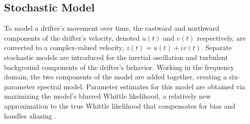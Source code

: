 \documentclass{stat572Style}
\begin{document}
\subsection{Stochastic Model}
 To model a drifter's movement over time, the eastward and northward components of the drifter's velocity, denoted $u(t)$ and $v(t)$ respectively, are converted to a complex-valued velocity, $z(t) = u(t) + iv(t)$. 
 Separate stochastic models are introduced for the inertial oscillation and turbulent background components of the drifter's behavior. 
 Working in the frequency domain, the two components of the model are added together, creating a six-parameter spectral model. 
 Parameter estimates for this model are obtained via maximizing the model's blurred Whittle likelihood, a relatively new approximation to the true Whittle likelihood that compensates for bias and handles aliasing \citep{Sykulski2013}. 
 
\end{document}
